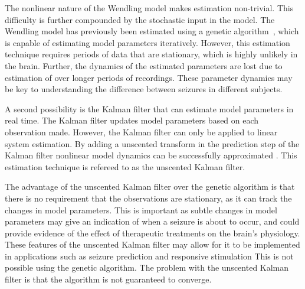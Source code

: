 



The nonlinear nature of the Wendling model makes estimation non-trivial. This difficulty is further compounded by the stochastic input in the model. The Wendling model has previously been estimated using a genetic algorithm~\citep{wendling2005interictal}, which is capable of estimating model parameters iteratively. However, this estimation technique requires periods of data that are stationary, which is highly unlikely in the brain. Further, the dynamics of the estimated parameters are lost due to estimation of over longer periods of recordings. These parameter dynamics may be key to understanding the difference between seizures in different subjects.

A second possibility is the Kalman filter that can estimate model parameters in real time. The Kalman filter updates model parameters based on each observation made. However, the Kalman filter can only be applied to linear system estimation. By adding a unscented transform  in the prediction step of the Kalman filter nonlinear model dynamics can be successfully approximated . This estimation technique is refereed to as the unscented Kalman filter. 

The advantage of the unscented Kalman filter over the genetic algorithm is that there is no requirement that the observations are stationary, as it can track the changes in model parameters. This is important as subtle changes in model parameters may give an indication of when a seizure is about to occur, and could provide evidence of the effect of therapeutic treatments on the brain's physiology. These features of the unscented Kalman filter may allow for it to be implemented in applications such as seizure prediction and responsive stimulation This is not possible using the genetic algorithm. The problem with the unscented Kalman filter is that the algorithm is not guaranteed to converge. 

